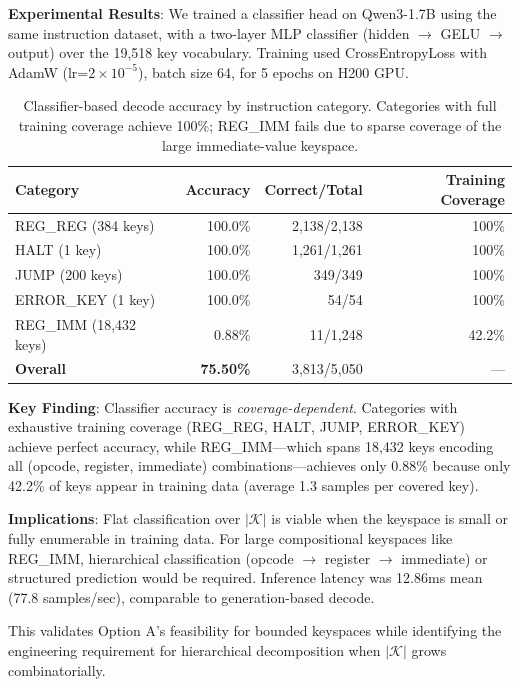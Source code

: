\documentclass[11pt,a4paper]{article}
\begin{document}
\textbf{Experimental Results}: We trained a classifier head on Qwen3-1.7B using the same instruction dataset, with a two-layer MLP classifier (hidden $\rightarrow$ GELU $\rightarrow$ output) over the 19,518 key vocabulary. Training used CrossEntropyLoss with AdamW (lr=$2 \times 10^{-5}$), batch size 64, for 5 epochs on H200 GPU.

\begin{table}[h]
\centering
\small
\begin{tabular}{lrrr}
\toprule
\textbf{Category} & \textbf{Accuracy} & \textbf{Correct/Total} & \textbf{Training Coverage} \\
\midrule
REG\_REG (384 keys) & 100.0\% & 2,138/2,138 & 100\% \\
HALT (1 key) & 100.0\% & 1,261/1,261 & 100\% \\
JUMP (200 keys) & 100.0\% & 349/349 & 100\% \\
ERROR\_KEY (1 key) & 100.0\% & 54/54 & 100\% \\
REG\_IMM (18,432 keys) & 0.88\% & 11/1,248 & 42.2\% \\
\midrule
\textbf{Overall} & \textbf{75.50\%} & 3,813/5,050 & --- \\
\bottomrule
\end{tabular}
\caption{Classifier-based decode accuracy by instruction category. Categories with full training coverage achieve 100\%; REG\_IMM fails due to sparse coverage of the large immediate-value keyspace.}
\label{tab:classifier-results}
\end{table}

\textbf{Key Finding}: Classifier accuracy is \textit{coverage-dependent}. Categories with exhaustive training coverage (REG\_REG, HALT, JUMP, ERROR\_KEY) achieve perfect accuracy, while REG\_IMM---which spans 18,432 keys encoding all (opcode, register, immediate) combinations---achieves only 0.88\% because only 42.2\% of keys appear in training data (average 1.3 samples per covered key).

\textbf{Implications}: Flat classification over $|\mathcal{K}|$ is viable when the keyspace is small or fully enumerable in training data. For large compositional keyspaces like REG\_IMM, hierarchical classification (opcode $\rightarrow$ register $\rightarrow$ immediate) or structured prediction would be required. Inference latency was 12.86ms mean (77.8 samples/sec), comparable to generation-based decode.

This validates Option A's feasibility for bounded keyspaces while identifying the engineering requirement for hierarchical decomposition when $|\mathcal{K}|$ grows combinatorially.
\end{document}
